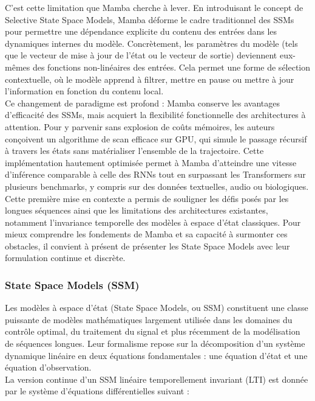 C'est cette limitation que Mamba cherche à lever. En introduisant le concept de Selective State Space Models, Mamba déforme le cadre traditionnel des SSMs pour permettre une dépendance explicite du contenu des entrées dans les dynamiques internes du modèle. Concrètement, les paramètres du modèle (tels que le vecteur de mise à jour de l'état ou le vecteur de sortie) deviennent eux-mêmes des fonctions non-linéaires des entrées. Cela permet une forme de sélection contextuelle, où le modèle apprend à filtrer, mettre en pause ou mettre à jour l'information en fonction du contenu local.\\

Ce changement de paradigme est profond : Mamba conserve les avantages d'efficacité des SSMs, mais acquiert la flexibilité fonctionnelle des architectures à attention. Pour y parvenir sans explosion de coûts mémoires, les auteurs conçoivent un algorithme de scan efficace sur GPU, qui simule le passage récursif à travers les états sans matérialiser l'ensemble de la trajectoire. Cette implémentation hautement optimisée permet à Mamba d'atteindre une vitesse d'inférence comparable à celle des RNNs tout en surpassant les Transformers sur plusieurs benchmarks, y compris sur des données textuelles, audio ou biologiques.\\

Cette première mise en contexte a permis de souligner les défis posés par les longues séquences ainsi que les limitations des architectures existantes, notamment l'invariance temporelle des modèles à espace d’état classiques. Pour mieux comprendre les fondements de Mamba et sa capacité à surmonter ces obstacles, il convient à présent de présenter les State Space Models avec leur formulation continue et discrète.

\subsubsection{State Space Models (SSM)}

Les modèles à espace d’état (State Space Models, ou SSM) constituent une classe puissante de modèles mathématiques largement utilisée dans les domaines du contrôle optimal, du traitement du signal et plus récemment de la modélisation de séquences longues. Leur formalisme repose sur la décomposition d’un système dynamique linéaire en deux équations fondamentales : une équation d’état et une équation d’observation.\\

La version continue d’un SSM linéaire temporellement invariant (LTI) est donnée par le système d’équations différentielles suivant :

